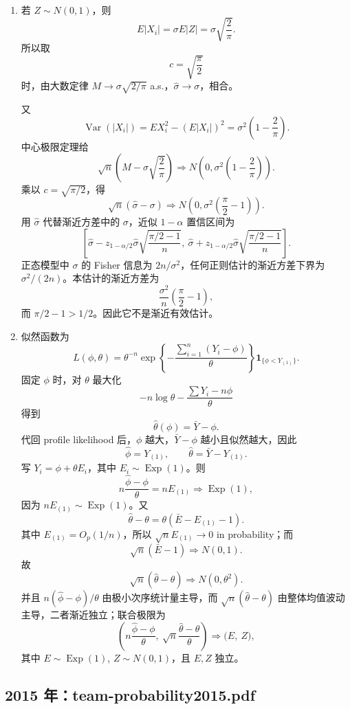 \documentclass[UTF8,12pt]{ctexart}
\begin{document}
\begin{enumerate}[label=\textbf{\arabic*.},leftmargin=2.2em]
\item 若 \(Z\sim N(0,1)\)，则
\[
E|X_i|=\sigma E|Z|=\sigma\sqrt{\frac2\pi}.
\]
所以取
\[
c=\sqrt{\frac\pi2}
\]
时，由大数定律 \(M\to\sigma\sqrt{2/\pi}\) a.s.，\(\widehat\sigma\to\sigma\)，相合。

又
\[
\operatorname{Var}(|X_i|)
=E X_i^2-(E|X_i|)^2
=\sigma^2\left(1-\frac2\pi\right).
\]
中心极限定理给
\[
\sqrt n\left(M-\sigma\sqrt{\frac2\pi}\right)
\Rightarrow N\left(0,\sigma^2\left(1-\frac2\pi\right)\right).
\]
乘以 \(c=\sqrt{\pi/2}\)，得
\[
\sqrt n(\widehat\sigma-\sigma)
\Rightarrow N\left(0,\sigma^2\left(\frac\pi2-1\right)\right).
\]
用 \(\widehat\sigma\) 代替渐近方差中的 \(\sigma\)，近似 \(1-\alpha\) 置信区间为
\[
\left[
\widehat\sigma-z_{1-\alpha/2}\widehat\sigma\sqrt{\frac{\pi/2-1}{n}},
\ \widehat\sigma+z_{1-\alpha/2}\widehat\sigma\sqrt{\frac{\pi/2-1}{n}}
\right].
\]
正态模型中 \(\sigma\) 的 Fisher 信息为 \(2n/\sigma^2\)，任何正则估计的渐近方差下界为 \(\sigma^2/(2n)\)。本估计的渐近方差为
\[
\frac{\sigma^2}{n}\left(\frac\pi2-1\right),
\]
而 \(\pi/2-1>1/2\)。因此它不是渐近有效估计。

\item 似然函数为
\[
L(\phi,\theta)=\theta^{-n}\exp\left\{-\frac{\sum_{i=1}^n(Y_i-\phi)}{\theta}\right\}
\mathbf 1_{\{\phi<Y_{(1)}\}}.
\]
固定 \(\phi\) 时，对 \(\theta\) 最大化
\[
-n\log\theta-\frac{\sum Y_i-n\phi}{\theta}
\]
得到
\[
\widehat\theta(\phi)=\bar Y-\phi.
\]
代回 profile likelihood 后，\(\phi\) 越大，\(\bar Y-\phi\) 越小且似然越大，因此
\[
\widehat\phi=Y_{(1)},\qquad
\widehat\theta=\bar Y-Y_{(1)}.
\]
写 \(Y_i=\phi+\theta E_i\)，其中 \(E_i\sim \operatorname{Exp}(1)\)。则
\[
n\frac{\widehat\phi-\phi}{\theta}
=nE_{(1)}\Rightarrow \operatorname{Exp}(1),
\]
因为 \(nE_{(1)}\sim \operatorname{Exp}(1)\)。又
\[
\widehat\theta-\theta
=\theta(\bar E-E_{(1)}-1).
\]
其中 \(E_{(1)}=O_p(1/n)\)，所以 \(\sqrt n E_{(1)}\to0\) in probability；而
\[
\sqrt n(\bar E-1)\Rightarrow N(0,1).
\]
故
\[
\sqrt n(\widehat\theta-\theta)\Rightarrow N(0,\theta^2).
\]
并且 \(n(\widehat\phi-\phi)/\theta\) 由极小次序统计量主导，而 \(\sqrt n(\widehat\theta-\theta)\) 由整体均值波动主导，二者渐近独立；联合极限为
\[
\left(n\frac{\widehat\phi-\phi}{\theta},\ \sqrt n\frac{\widehat\theta-\theta}{\theta}\right)
\Rightarrow \bigl(E,\ Z\bigr),
\]
其中 \(E\sim\operatorname{Exp}(1)\), \(Z\sim N(0,1)\)，且 \(E,Z\) 独立。
\end{enumerate}


\subsection{2015 年：team-probability2015.pdf}
\end{document}
